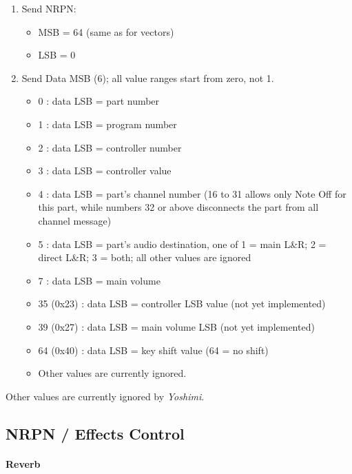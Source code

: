    \begin{enumerate}
      \item Send NRPN:
      \begin{itemize}
         \item MSB = 64 (same as for vectors)
         \item LSB = 0
      \end{itemize}
      \item Send Data MSB (6); all value ranges start from zero, not 1.
      \begin{itemize}
         \item 0 : data LSB = part number
         \item 1 : data LSB = program number
         \item 2 : data LSB = controller number
         \item 3 : data LSB = controller value
         \item 4 : data LSB = part's channel number (16 to 31 allows only
            Note Off for this part, while numbers 32 or above disconnects
            the part from all channel message)
         \item 5 : data LSB = part's audio destination, one of
                    1 = main L\&R;
                    2 = direct L\&R;
                    3 = both;
                    all other values are ignored
         \item 7 : data LSB = main volume
         \item 35 (0x23) : data LSB = controller LSB value (not yet implemented)
         \item 39 (0x27) : data LSB = main volume LSB (not yet implemented)
         \item 64 (0x40) : data LSB = key shift value (64 = no shift)
         \item Other values are currently ignored.
      \end{itemize}
   \end{enumerate}

   Other values are currently ignored by \textsl{Yoshimi}.

\subsection{NRPN / Effects Control}
\label{subsection:nrpns_midi_nrpn_effects_control}

\paragraph{Reverb}

